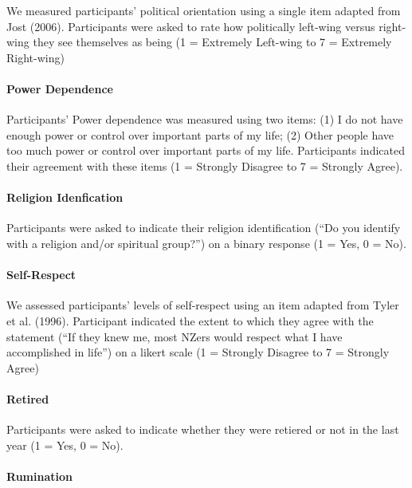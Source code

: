 \documentclass[
  letterpaper,
  DIV=11,
  numbers=noendperiod]{scrartcl}
\let\oldparagraph\paragraph
\renewcommand{\paragraph}[1]{\oldparagraph{#1}\mbox{}}
\begin{document}
We measured participants' political orientation using a single item
adapted from Jost (2006). Participants were asked to rate how
politically left-wing versus right-wing they see themselves as being (1
= Extremely Left-wing to 7 = Extremely Right-wing)

\hypertarget{power-dependence}{%
\paragraph{Power Dependence}\label{power-dependence}}

Participants' Power dependence was measured using two items: (1) I do
not have enough power or control over important parts of my life; (2)
Other people have too much power or control over important parts of my
life. Participants indicated their agreement with these items (1 =
Strongly Disagree to 7 = Strongly Agree).

\hypertarget{religion-idenfication}{%
\paragraph{Religion Idenfication}\label{religion-idenfication}}

Participants were asked to indicate their religion identification (``Do
you identify with a religion and/or spiritual group?'') on a binary
response (1 = Yes, 0 = No).

\hypertarget{self-respect}{%
\paragraph{Self-Respect}\label{self-respect}}

We assessed participants' levels of self-respect using an item adapted
from Tyler et al. (1996). Participant indicated the extent to which they
agree with the statement (``If they knew me, most NZers would respect
what I have accomplished in life'') on a likert scale (1 = Strongly
Disagree to 7 = Strongly Agree)

\hypertarget{retired}{%
\paragraph{Retired}\label{retired}}

Participants were asked to indicate whether they were retiered or not in
the last year (1 = Yes, 0 = No).

\hypertarget{rumination}{%
\paragraph{Rumination}\label{rumination}}
\end{document}
